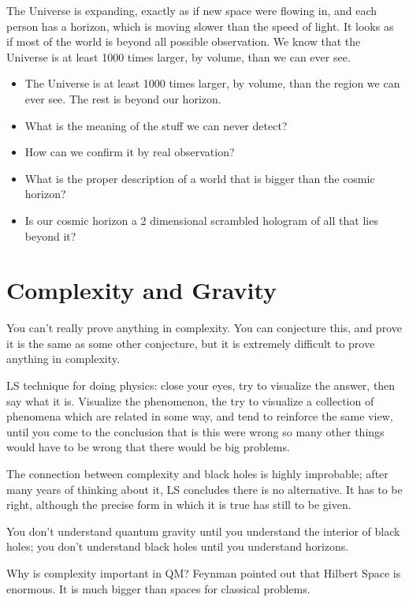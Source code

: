 \documentclass[]{article}
\begin{document}
The Universe is expanding, exactly as if new space were flowing in, and each person has a horizon, which is moving slower than the speed of light. It looks as if most of the world is beyond all possible observation. We know that the Universe is at least 1000 times larger, by volume, than we can ever see.

\begin{itemize}
	\item The Universe is at least 1000 times larger, by volume, than the region we can ever see. The rest is beyond our horizon.
	\item What is the meaning of the stuff we can never detect?
	\item How can we confirm it by real observation?
	\item What is the proper description of a world that is bigger than the cosmic horizon?
	\item Is our cosmic horizon a 2 dimensional scrambled hologram of all that lies beyond it? 
\end{itemize}

\section{Complexity and Gravity }

You can't really prove anything in complexity. You can conjecture this, and prove it is the same as some other conjecture, but it is extremely difficult to prove anything in complexity.\cite{susskind2018complexity}

LS technique for doing physics: close your eyes, try to visualize the answer, then say what it is. Visualize the phenomenon, the try to visualize a collection of phenomena which are related in some way, and tend to reinforce the same view, until you come to the conclusion that is this were wrong so many other things would have to be wrong that there would be big problems.

The connection between complexity and black holes is highly improbable; after many years of thinking about it, LS concludes there is no alternative. It has to be right, although the precise form in which it is true has still to be given.

You don't understand quantum gravity until you understand the interior of black holes; you don't understand black holes until you understand horizons.

Why is complexity important in QM? Feynman pointed out that Hilbert Space is enormous. It is much bigger than spaces for classical problems.
\end{document}
